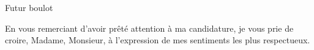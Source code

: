 \documentclass[11pt]{lettre}
\begin{document}
\begin{letter}{Futur boulot}





    
    \closing{En vous remerciant d’avoir prêté attention à ma candidature, je vous prie de croire, Madame, Monsieur, à l’expression de mes sentiments les plus respectueux.}
    
 
\end{letter}
 
\end{document}
